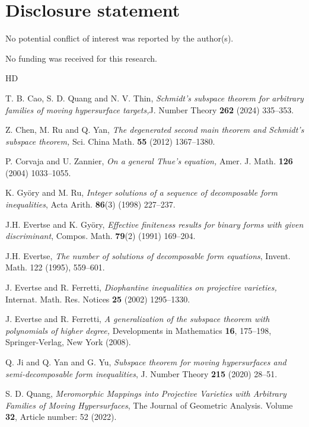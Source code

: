 \documentclass[12pt,leqno]{amsart}
\numberwithin{equation}{section}
\begin{document}
\section*{Disclosure statement}
No potential conflict of interest was reported by the author(s).

No funding was received for this research.

\begin{thebibliography}{HD}

 T. B. Cao, S. D. Quang and N. V. Thin, \textit{Schmidt's subspace theorem for arbitrary families of moving hypersurface targets,}J. Number Theory \textbf{262} (2024) 335--353.

 Z. Chen, M. Ru and Q. Yan, \textit{The degenerated second main theorem and Schmidt's subspace theorem,} Sci. China Math. \textbf{55} (2012) 1367--1380.

 P. Corvaja and U. Zannier, \textit{On a general Thue's equation,} Amer. J. Math. \textbf{126} (2004) 1033--1055.

 K. Gy\"{o}ry and M. Ru, \textit{Integer solutions of a sequence of decomposable form inequalities}, Acta Arith. \textbf{86}(3) (1998) 227--237.

 J.H. Evertse and K. Gy\"{o}ry, \textit{Effective finiteness results for binary forms with given discriminant}, Compos. Math. \textbf{79}(2) (1991) 169--204.

 J.H. Evertse, \textit{The number of solutions of decomposable form equations}, Invent. Math. 122 (1995), 559--601.

 J. Evertse and R. Ferretti, \textit{Diophantine inequalities on projective varieties,} Internat. Math. Res. Notices \textbf{25} (2002) 1295--1330.

 J. Evertse and R. Ferretti, \textit{A generalization of the subspace theorem with polynomials of higher degree,} Developments in Mathematics \textbf{16}, 175--198, Springer-Verlag, New York (2008).

 Q. Ji and Q. Yan and G. Yu, \textit{Subspace theorem for moving hypersurfaces and semi-decomposable form inequalities}, J. Number Theory \textbf{215} (2020) 28--51.

 S. D. Quang, {\it Meromorphic Mappings into Projective Varieties with Arbitrary Families of Moving Hypersurfaces}, The Journal of Geometric Analysis. Volume \textbf{32}, Article number: 52 (2022).


\end{thebibliography}
\end{document}
